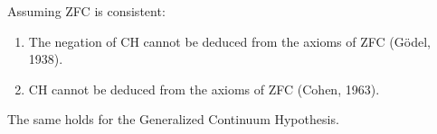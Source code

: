 Assuming ZFC is consistent:
\begin{enumerate}
\item[(a)] The negation of CH cannot be deduced from the axioms of ZFC (Gödel, 1938).
\item[(b)] CH cannot be deduced from the axioms of ZFC (Cohen, 1963).
\end{enumerate}
The same holds for the Generalized Continuum Hypothesis.
